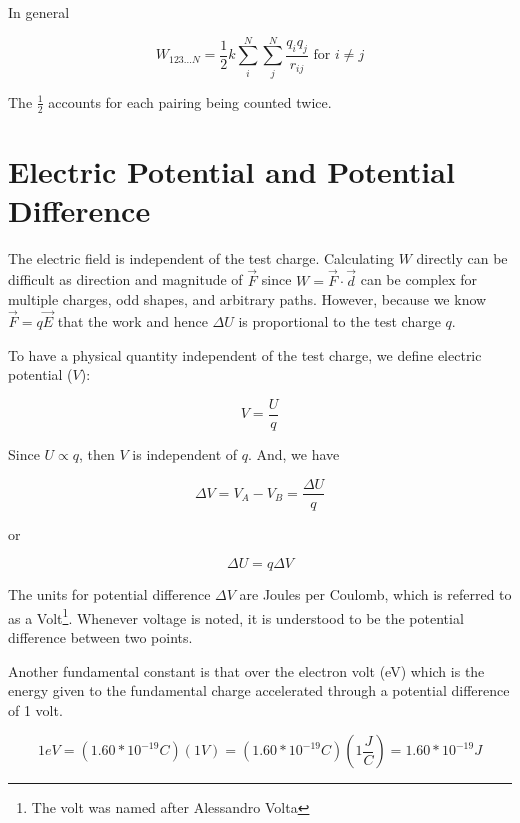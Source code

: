 \documentclass[14pt]{memoir}
\begin{document}
In general

\begin{equation}
W_{123...N} = \frac{1}{2} k \sum_{i}^{N} \sum_{j}^{N} \frac{q_i q_j}{r_{ij}} \text{ for } i \neq j
\end{equation}

The $\frac{1}{2}$ accounts for each pairing being counted twice. 



\section{Electric Potential and Potential Difference}

The electric field is independent of the test charge. Calculating $W$ directly can be difficult as direction and magnitude of $\vec{F}$ since $W= \vec{F} \cdot \vec{d}$ can be complex for multiple charges, odd shapes, and arbitrary paths. However, because we know $\vec{F} = q \vec{E}$ that the work and hence $\Delta U$ is proportional to the test charge $q$. 

To have a physical quantity independent of the test charge, we define electric potential ($V$):

\begin{equation}
V = \frac{U}{q}
\end{equation}

Since $U \propto q$, then $V$ is independent of $q$. And, we have

\begin{equation}
\Delta V = V_A - V_B = \frac{\Delta U}{q}
\end{equation}

or 

\begin{equation}
\Delta U = q \Delta V
\end{equation}

The units for potential difference $\Delta V$ are Joules per Coulomb, which is referred to as a Volt\footnote{The volt was named after Alessandro Volta}. Whenever voltage is noted, it is understood to be the potential difference between two points. 

Another fundamental constant is that over the electron volt (eV) which is the energy given to the fundamental charge accelerated through a potential difference of 1 volt.

\begin{equation}
1 eV = (1.60 * 10^{-19} C)(1V) = (1.60 * 10^{-19} C)(1 \frac{J}{C}) = 1.60 * 10^{-19} J
\end{equation} 
\end{document}
